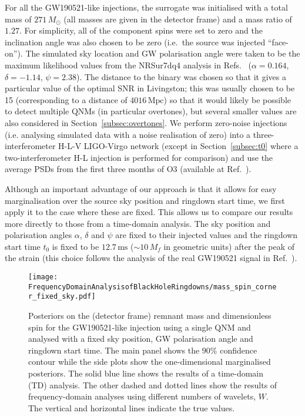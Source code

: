 For all the GW190521-like injections, the surrogate was initialised with a total mass of $271\,M_\odot$ (all masses are given in the detector frame) and a mass ratio of $1.27$. 
For simplicity, all of the component spins were set to zero and the inclination angle was also chosen to be zero (i.e.\ the source was injected ``face-on'').
The simulated sky location and GW polarisation angle were taken to be the maximum likelihood values from the NRSur7dq4 analysis in Refs.~\cite{LIGOScientific:2020ibl, gwtc2datarelease} ($\alpha = 0.164$, $\delta = -1.14$, $\psi = 2.38$).
The distance to the binary was chosen so that it gives a particular value of the optimal SNR in Livingston; this was usually chosen to be 15 (corresponding to a distance of $4016\,\mathrm{Mpc}$) so that it would likely be possible to detect multiple QNMs (in particular overtones), but several smaller values are also considered in Section~\ref{subsec:overtones}.
We perform zero-noise injections (i.e. analysing simulated data with a noise realisation of zero) into a three-interferometer H-L-V LIGO-Virgo network (except in Section~\ref{subsec:t0} where a two-interferometer H-L injection is performed for comparison) and use the average PSDs from the first three months of O3 (available at Ref.~\cite{o3psd}).

Although an important advantage of our approach is that it allows for easy marginalisation over the source sky position and ringdown start time, we first apply it to the case where these are fixed. 
This allows us to compare our results more directly to those from a time-domain analysis.
The sky position and polarisation angles $\alpha$, $\delta$ and $\psi$ are fixed to their injected values and the ringdown start time $t_0$ is fixed to be $12.7\,\mathrm{ms}$ ($\sim 10\,M_f$ in geometric units) after the peak of the strain (this choice follows the analysis of the real GW190521 signal in Ref.~\cite{LIGOScientific:2020iuh}).

\begin{figure}[t!]
    \centering
    \texttt{[image: FrequencyDomainAnalysisofBlackHoleRingdowns/mass\_spin\_corner\_fixed\_sky.pdf]}
    \caption[Posteriors on the remnant mass and spin for a GW190521-like injection analysed with a fixed sky position, GW polarisation angle and ringdown start time]{ 
    Posteriors on the (detector frame) remnant mass and dimensionless spin for the GW190521-like injection using a single QNM and analysed with a fixed sky position, GW polarisation angle and ringdown start time.
    The main panel shows the $90\%$ confidence contour while the side plots show the one-dimensional marginalised posteriors.
    The solid blue line shows the results of a time-domain (TD) analysis.
    The other dashed and dotted lines show the results of frequency-domain analyses using different numbers of wavelets, $W$.
    The vertical and horizontal lines indicate the true values.
    }
    \label{fig:mass_spin_corner_fixed_sky}
\end{figure}

